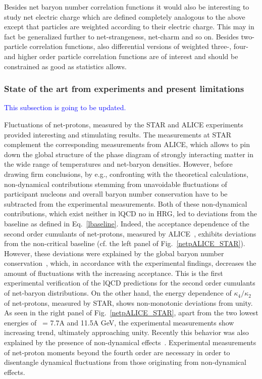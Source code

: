 Besides net baryon number correlation functions it would also be interesting to study net electric charge \cite{Aziz:2004qu, Ling:2013ksb} which are defined completely analogous to the above except that particles are weighted according to their electric charge. This may in fact be generalized further to net-strangeness, net-charm and so on. Besides two-particle correlation functions, also differential versions of weighted three-, four- and higher order particle correlation functions  are of interest and should be constrained as good as statistics allows.

\subsubsection{State of the art from experiments and present limitations}
\textcolor{blue}{This subsection is going to be updated.}

Fluctuations of net-protons, measured by the STAR and ALICE experiments provided interesting and stimulating results. The measurements at STAR complement the corresponding measurements from ALICE, which allows to pin down the global structure of the phase diagram of strongly interacting matter in the wide range of temperatures and net-baryon densities. However, before drawing firm conclusions, by e.g., confronting with the theoretical calculations, non-dynamical contributions stemming from unavoidable fluctuations of  participant nucleons and  overall baryon number conservation have to be subtracted from the experimental measurements. Both of these non-dynamical contributions, which exist neither in lQCD no in HRG, led to deviations from the baseline as defined in Eq.~\ref{lbaseline}. Indeed, the acceptance dependence of the second order cumulants of net-protons, measured by ALICE~\cite{Rustamov:2017lio}, exhibits deviations from the non-critical baseline (cf. the left panel of Fig.~\ref{netpALICE_STAR}). However, these deviations were explained by the global baryon number conservation~\cite{Rustamov:2017lio, Braun-Munzinger:2016yjz, Braun-Munzinger:2018yru}, which, in accordance with the experimental findings, decreases the amount of fluctuations with the increasing acceptance. This is the first experimental verification of the lQCD predictions for the second order cumulants of net-baryon distributions. On the other hand, the energy dependence of $\kappa_{4}/\kappa_{2}$ of net-protons, measured by STAR, shows non-monotonic deviations from unity. As seen in the right panel of Fig.~\ref{netpALICE_STAR}, apart from the two lowest energies of \sqrtsNN~= 7.7A and 11.5A GeV, the experimental measurements show increasing trend, ultimately approaching unity. Recently this  behavior was also explained by the presence of non-dynamical effects~\cite{Braun-Munzinger:2018yru}. Experimental measurements of net-proton moments beyond the fourth order are necessary in order to disentangle dynamical fluctuations from those originating from non-dynamical effects.

